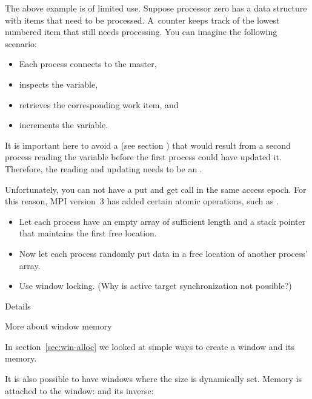 The above example is of limited use.
Suppose processor zero has a data structure 
with items that need to be processed. A~counter 
keeps track of the lowest numbered item that still needs processing.
You can imagine the following
 scenario:
\begin{itemize}
\item Each process connects to the master,
\item inspects the  variable,
\item retrieves the corresponding work item, and
\item increments the  variable.
\end{itemize}
It is important here to avoid a 
(see section ) that would result
from a second process reading the  variable 
before the first process could have updated it. Therefore, the reading
and updating needs to be an .

Unfortunately, you can not have a put and get call in the same access
epoch. For this reason, MPI version~3 has added certain atomic
operations, such as .

\begin{exercise}
  \label{ex:onesidedbuild}
  \begin{itemize}
  \item
    Let each process have an empty array of sufficient length and a
    stack pointer that maintains the first free location.
  \item
    Now let each process randomly put data in a free location of another
    process' array.
  \item Use window locking. (Why is active target synchronization not possible?)
  \end{itemize}
\end{exercise}

 {Details}

 {More about window memory}
\label{sec:win-model}

In section~\ref{sec:win-alloc} we looked at simple ways to create a
window and its memory.

It is also possible to have windows where the size is dynamically set.
%
%
Memory is attached to the window:
%
%
and its inverse:
%

